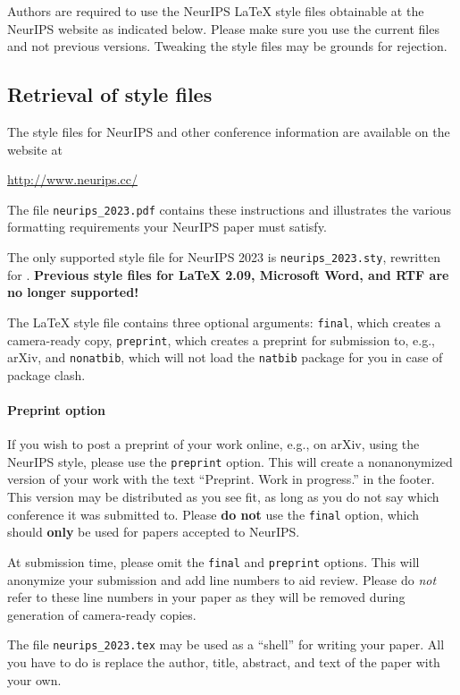 \documentclass{article}
\begin{document}
Authors are required to use the NeurIPS \LaTeX{} style files obtainable at the
NeurIPS website as indicated below. Please make sure you use the current files
and not previous versions. Tweaking the style files may be grounds for
rejection.


\subsection{Retrieval of style files}


The style files for NeurIPS and other conference information are available on
the website at
\begin{center}
  \url{http://www.neurips.cc/}
\end{center}
The file \verb+neurips_2023.pdf+ contains these instructions and illustrates the
various formatting requirements your NeurIPS paper must satisfy.


The only supported style file for NeurIPS 2023 is \verb+neurips_2023.sty+,
rewritten for \LaTeXe{}.  \textbf{Previous style files for \LaTeX{} 2.09,
  Microsoft Word, and RTF are no longer supported!}


The \LaTeX{} style file contains three optional arguments: \verb+final+, which
creates a camera-ready copy, \verb+preprint+, which creates a preprint for
submission to, e.g., arXiv, and \verb+nonatbib+, which will not load the
\verb+natbib+ package for you in case of package clash.


\paragraph{Preprint option}
If you wish to post a preprint of your work online, e.g., on arXiv, using the
NeurIPS style, please use the \verb+preprint+ option. This will create a
nonanonymized version of your work with the text ``Preprint. Work in progress.''
in the footer. This version may be distributed as you see fit, as long as you do not say which conference it was submitted to. Please \textbf{do
  not} use the \verb+final+ option, which should \textbf{only} be used for
papers accepted to NeurIPS. 


At submission time, please omit the \verb+final+ and \verb+preprint+
options. This will anonymize your submission and add line numbers to aid
review. Please do \emph{not} refer to these line numbers in your paper as they
will be removed during generation of camera-ready copies.


The file \verb+neurips_2023.tex+ may be used as a ``shell'' for writing your
paper. All you have to do is replace the author, title, abstract, and text of
the paper with your own.
\end{document}

